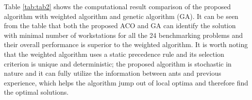 Table \ref{tab:tab2} shows the computational result comparison of the proposed algorithm with weighted algorithm and genetic algorithm (GA).
It can be seen from the table that both the proposed ACO and GA can identify the solution with minimal number of workstations for all the 24 benchmarking problems and their overall performance is superior to the weighted algorithm.
It is worth noting that the weighted algorithm uses a static precedence rule and its selection criterion is unique and deterministic; the proposed algorithm is stochastic in nature and it can fully utilize the information between ants and previous experience, which helps the algorithm jump out of local optima and therefore find the optimal solutions.



\begin{table}[h!]
	\label{tab:tab2}
	\centering
	\caption{Computational Result Comparisons on Benchmarking Problems}
\end{table}
